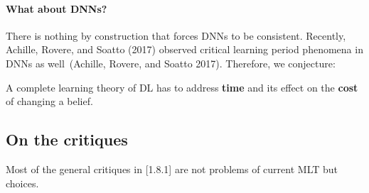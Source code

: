 \documentclass[
  letterpaper,
  12pt,
  british]{tufte-book}
\let\oldparagraph\paragraph
\renewcommand{\paragraph}[1]{\oldparagraph{#1}\mbox{}}
\theoremstyle{plain}
\theoremstyle{definition}
\theoremstyle{plain}
\theoremstyle{remark}
\begin{document}
\hypertarget{what-about-dnns}{%
\paragraph{\texorpdfstring{What about
{DNNs}?}{What about DNNs?}}\label{what-about-dnns}}

There is nothing by construction that forces {DNNs} to be consistent.
Recently, Achille, Rovere, and Soatto
(2017)
observed critical learning period phenomena in {DNNs} as well~(Achille,
Rovere, and Soatto
2017).
Therefore, we conjecture:

A complete learning theory of {DL} has to address \textbf{time} and its
effect on the \textbf{cost} of changing a belief.

\hypertarget{on-the-critiques}{%
\subsection{On the critiques}\label{on-the-critiques}}

Most of the general critiques in {[}1.8.1{]} are not problems of current
{MLT} but choices.
\end{document}
